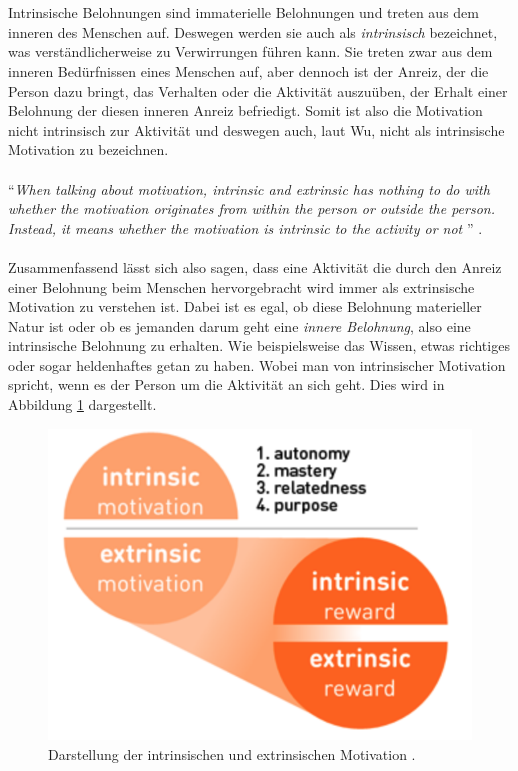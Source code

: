 \documentclass[a4paper,12pt,twoside]{scrartcl}
\begin{document}
\\\\
Intrinsische Belohnungen sind immaterielle Belohnungen und treten aus dem inneren des Menschen auf. Deswegen werden sie auch als \textit{intrinsisch} bezeichnet, was verständlicherweise zu Verwirrungen führen kann. Sie treten zwar aus dem inneren Bedürfnissen eines Menschen auf, aber dennoch ist der Anreiz, der die Person dazu bringt, das Verhalten oder die Aktivität auszuüben, der Erhalt einer Belohnung der diesen inneren Anreiz befriedigt. Somit ist also die Motivation nicht intrinsisch zur Aktivität und deswegen auch, laut Wu, nicht als intrinsische Motivation zu bezeichnen. 
\\\\
\enquote{\textit{When talking about motivation, intrinsic and extrinsic has nothing to do with whether the motivation originates from within the person or outside the person. Instead, it means whether the motivation is intrinsic to the activity or not }} \cite{Wu14}.
\\\\
Zusammenfassend lässt sich also sagen, dass eine Aktivität die durch den Anreiz einer Belohnung beim Menschen hervorgebracht wird immer als extrinsische Motivation zu verstehen ist. Dabei ist es egal, ob diese Belohnung materieller Natur ist oder ob es jemanden darum geht eine \textit{innere Belohnung}, also eine intrinsische Belohnung zu erhalten. Wie beispielsweise das Wissen, etwas richtiges oder sogar heldenhaftes getan zu haben. Wobei man von intrinsischer Motivation spricht, wenn es der Person um die Aktivität an sich geht. Dies wird in Abbildung \ref{MotivationSchaubild} dargestellt.
\\
\begin{figure}[h!]
\begin{center}
\includegraphics[scale = 0.6]{Bilder/MotivationSchaubild.png}
\caption{Darstellung der intrinsischen und extrinsischen Motivation  \cite{Wu14}.}
\label{MotivationSchaubild}
\end{center}
\end{figure}
\end{document}
